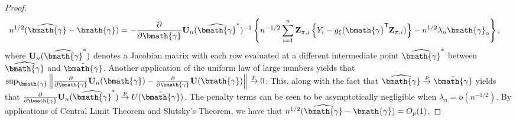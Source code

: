 \documentclass[useAMS,referee,usenatbib]{biom}
\def\bZ{\mathbf{Z}}
\def\bU{\mathbf{U}}
\def\bgam{\bmath{\gamma}}
\def\bgamhat{\widehat{\bmath{\gamma}}}
\def\bgambar{\bar{\bmath{\gamma}}}
\def\trans{^{\sf \tiny T}}
\def\bZpii{\bZ_{\pi,i}}
\def\bZpii{\bZ_{\pi,i}}
\newcommand{\norm}[1]{\left\lVert#1\right\rVert}
\begin{document}
\begin{lemma}
\begin{proof}
\begin{align*}
            n^{1/2}(\bgamhat-\bgambar) &= -\frac{\partial}{\partial\bgam} \bU_n(\bgamhat^*)^{-1}\left\{n^{-1/2}\sum_{i=1}^n \bZpii \left\{ Y_i - g_{\xi}(\bgambar\trans\bZpii)\right\} - n^{1/2}\lambda_n \bgambar_{\circ} \right\},
        \end{align*}
        where $\bU_n(\bgamhat^*)$ denotes a Jacobian matrix with each row evaluated at a different intermediate point $\bgamhat^*$ between $\bgamhat$ and $\bgambar$.  Another application of the uniform law of large numbers yields that $\sup_{\bgam}\norm{\frac{\partial}{\partial\bgam}\bU_n(\bgam) - \frac{\partial}{\partial\bgam}\bU(\bgam)}\overset{p}{\to}0$.
        This, along with the fact that $\bgamhat\overset{p}{\to}\bgambar$ yields that $\frac{\partial}{\partial\bgam}\bU_n(\bgamhat^*)\overset{p}{\to}U(\bgambar)$. The penalty terms can be seen to be asymptotically negligible when $\lambda_n = o(n^{-1/2})$.  By applications of Central Limit Theorem and Slutsky's Theorem, we have that $n^{1/2}(\bgamhat - \bgambar) = O_p(1)$.
    \end{proof}
\end{lemma}
\end{document}
